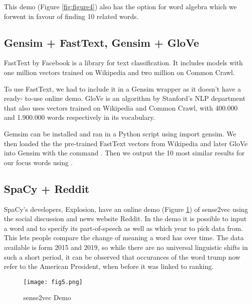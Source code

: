 \documentclass[12pt, usenames, dvipsnames]{report}
\begin{document}
\begin{flushleft}
This demo (Figure \ref{fig:figure4}) also has the option for word algebra which we forwent in favour of finding 10 related words.

\subsection{Gensim + FastText, Gensim + GloVe}

FastText by Facebook is a library for text classification.
It includes models with one million vectors trained on Wikipedia and two million on Common Crawl.

To use FastText, we had to include it in a Gensim wrapper as it doesn’t have a ready- to-use online demo.
GloVe is an algorithm by Stanford’s NLP department that also uses vectors trained on Wikipedia and Common Crawl, with 400.000 and 1.900.000 words respectively in its vocabulary.

Gemsim can be installed and ran in a Python script using import gensim.
We then loaded the the pre-trained FastText vectors from Wikipedia and later GloVe into Gensim with the command .
Then we output the 10 most similar results for our focus words using .

\subsection{SpaCy + Reddit}

SpaCy’s developers, Explosion, have an online demo (Figure \ref{fig:figure5}) of sense2vec using the social discussion and news website Reddit.
In the demo it is possible to input a word and to specify its part-of-speech as well as which year to pick data from.
This lets people compare the change of meaning a word has over time.
The data available is form 2015 and 2019, so while there are no universal linguistic shifts in such a short period, it can be observed that occurances of the word trump now refer to the American President, when before it was linked to ranking.

\vspace*{1.2em}
\begin{figure}[!htbp]
  \hspace*{-3.666em}
  \texttt{[image: fig5.png]}
  \caption{sense2vec Demo}
  \label{fig:figure5}
\end{figure}
\vspace*{1.2em}


\end{flushleft}
\end{document}
